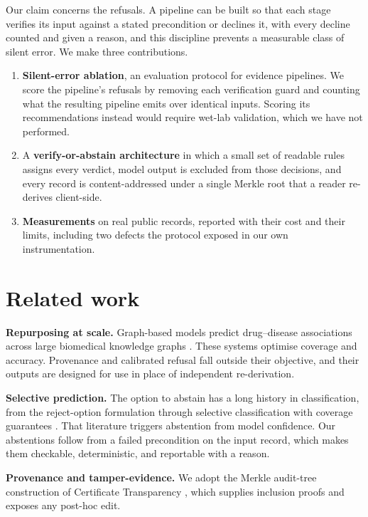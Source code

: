 \documentclass{article}
\begin{document}
Our claim concerns the refusals. A pipeline can be built so that each stage
verifies its input against a stated precondition or declines it, with every
decline counted and given a reason, and this discipline prevents a measurable
class of silent error. We make three contributions.

\begin{enumerate}
\item \textbf{Silent-error ablation}, an evaluation protocol for evidence
pipelines. We score the pipeline's refusals by removing each verification
guard and counting what the resulting pipeline emits over identical inputs.
Scoring its recommendations instead would require wet-lab validation, which we
have not performed.
\item A \textbf{verify-or-abstain architecture} in which a small set of
readable rules assigns every verdict, model output is excluded from those
decisions, and every record is content-addressed under a single Merkle root
that a reader re-derives client-side.
\item \textbf{Measurements} on \CorpusFetched{} real public records, reported
with their cost and their limits, including two defects the protocol exposed
in our own instrumentation.
\end{enumerate}

\section{Related work}

\textbf{Repurposing at scale.} Graph-based models predict drug--disease
associations across large biomedical knowledge graphs \citep{txgnn}. These
systems optimise coverage and accuracy. Provenance and calibrated refusal fall
outside their objective, and their outputs are designed for use in place of
independent re-derivation.

\textbf{Selective prediction.} The option to abstain has a long history in
classification, from the reject-option formulation \citep{chow} through
selective classification with coverage guarantees \citep{elyaniv,geifman}.
That literature triggers abstention from model confidence. Our abstentions
follow from a failed precondition on the input record, which makes them
checkable, deterministic, and reportable with a reason.

\textbf{Provenance and tamper-evidence.} We adopt the Merkle audit-tree
construction of Certificate Transparency \citep{rfc6962}, which supplies
inclusion proofs and exposes any post-hoc edit.
\end{document}
